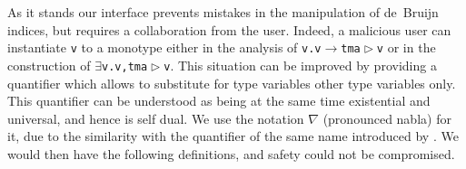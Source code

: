 \documentclass[9pt,authoryear]{sigplanconf}
\begin{document}
%
As it stands our interface prevents mistakes in the manipulation of de{~}Bruijn indices, but
    requires a collaboration from the user. 
    Indeed, a malicious user can instantiate \texttt{v} 
    to a monotype either in the analysis of
    \texttt{\makebox[1.22ex][c]{$ \forall $}}\texttt{\mbox{\hspace{0.50em}}}\texttt{v}\texttt{.}\texttt{\mbox{\hspace{0.50em}}}\texttt{v}\texttt{\mbox{\hspace{0.50em}}}\texttt{$ \rightarrow $}\texttt{\mbox{\hspace{0.50em}}}\texttt{tm}\texttt{\mbox{\hspace{0.50em}}}\texttt{\makebox[1.22ex][l]{$ {(} $}}\texttt{a}\texttt{\mbox{\hspace{0.50em}}}\texttt{$ \vartriangleright $}\texttt{\mbox{\hspace{0.50em}}}\texttt{v}\texttt{\makebox[1.22ex][r]{$ {)} $}} or in the construction of \texttt{$ \exists $}\texttt{\mbox{\hspace{0.50em}}}\texttt{v}\texttt{.}\texttt{\mbox{\hspace{0.50em}}}\texttt{\makebox[1.22ex][l]{$ {(} $}}\texttt{v,}\texttt{\mbox{\hspace{0.50em}}}\texttt{tm}\texttt{\mbox{\hspace{0.50em}}}\texttt{\makebox[1.22ex][l]{$ {(} $}}\texttt{a}\texttt{\mbox{\hspace{0.50em}}}\texttt{$ \vartriangleright $}\texttt{\mbox{\hspace{0.50em}}}\texttt{v}\texttt{\makebox[1.22ex][r]{$ {)} $}}\texttt{\makebox[1.22ex][r]{$ {)} $}}. This situation can be improved 
    by providing a quantifier which allows to substitute for type variables other type variables only.
    This
    quantifier can be understood as being at the same time existential and universal, 
    and hence is self dual.
    We use the notation \texttt{\ensuremath{\nabla}} (pronounced nabla) for it, due to the similarity with the quantifier
    of the same name introduced by \citet{miller_proof_2003}.
    We would then have the following definitions, and safety could not be compromised. %


%
%


{\nopagebreak }
\end{document}

